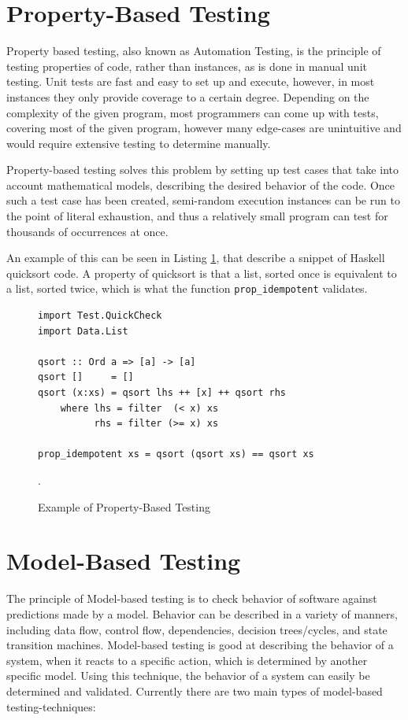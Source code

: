 \section{Property-Based Testing}

Property based testing, also known as Automation Testing, is the principle of testing properties of code, rather than instances, as is done in manual unit testing. Unit tests are fast and easy to set up and execute, however, in most instances they only provide coverage to a certain degree. Depending on the complexity of the given program, most programmers can come up with tests, covering most of the given program, however many edge-cases are unintuitive and would require extensive testing to determine manually.

Property-based testing solves this problem by setting up test cases that take into account mathematical models, describing the desired behavior of the code. Once such a test case has been created, semi-random execution instances can be run to the point of literal exhaustion, and thus a relatively small program can test for thousands of occurrences at once.

An example of this can be seen in Listing \ref{fig:pbtEx}, that describe a snippet of Haskell quicksort code. A property of quicksort is that a list, sorted once is equivalent to a list, sorted twice, which is what the function \lstinline{prop_idempotent} validates.
\begin{figure}
	\centering
	\begin{lstlisting}
import Test.QuickCheck
import Data.List

qsort :: Ord a => [a] -> [a]
qsort []     = []
qsort (x:xs) = qsort lhs ++ [x] ++ qsort rhs
    where lhs = filter  (< x) xs
          rhs = filter (>= x) xs

prop_idempotent xs = qsort (qsort xs) == qsort xs
	\end{lstlisting}
	\caption{Example of Property-Based Testing~\cite{realWorldHaskell11}}.
	\label{fig:pbtEx}
\end{figure}

\section{Model-Based Testing}

The principle of Model-based testing is to check behavior of software against predictions made by a model. Behavior can be described in a variety of manners, including data flow, control flow, dependencies, decision trees/cycles, and state transition machines. Model-based testing is good at describing the behavior of a system, when it reacts to a specific action, which is determined by another specific model. Using this technique, the behavior of a system can easily be determined and validated. Currently there are two main types of model-based testing-techniques:

